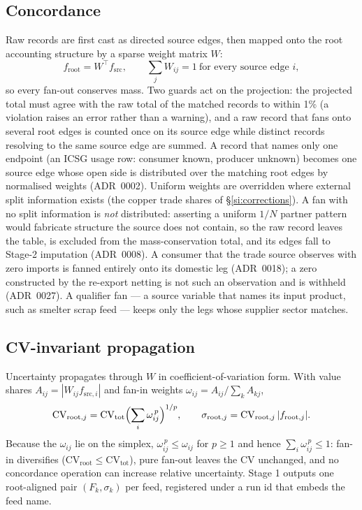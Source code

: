 \documentclass[11pt]{article}
\begin{document}
\subsection{Concordance}
Raw records are first cast as directed source edges, then mapped onto the
root accounting structure by a sparse weight matrix $W$:
\begin{equation}
f_{\mathrm{root}} = W^{\top} f_{\mathrm{src}},
\qquad \textstyle\sum_j W_{ij} = 1 \ \text{for every source edge } i,
\end{equation}
so every fan-out conserves mass. Two guards act on the projection: the
projected total must agree with the raw total of the matched records to
within 1\% (a violation raises an error rather than a warning), and a raw
record that fans onto several root edges is counted once on its source edge
while distinct records resolving to the same source edge are summed. A
record that names only one endpoint (an ICSG usage row: consumer known,
producer unknown) becomes one source edge whose open side is distributed
over the matching root edges by normalised weights (ADR~0002). Uniform
weights are overridden where external split information exists (the copper
trade shares of \S\ref{si:corrections}). A fan with no split information is
\emph{not} distributed: asserting a uniform $1/N$ partner pattern would
fabricate structure the source does not contain, so the raw record leaves
the table, is excluded from the mass-conservation total, and its edges fall
to Stage-2 imputation (ADR~0008). A consumer that the trade source observes
with zero imports is fanned entirely onto its domestic leg (ADR~0018); a
zero constructed by the re-export netting is not such an observation and is
withheld (ADR~0027). A qualifier fan --- a source variable that names its
input product, such as smelter scrap feed --- keeps only the legs whose
supplier sector matches.

\subsection{CV-invariant propagation}
Uncertainty propagates through $W$ in coefficient-of-variation form. With
value shares $A_{ij} = |W_{ij} f_{\mathrm{src},i}|$ and fan-in weights
$\omega_{ij} = A_{ij}/\sum_k A_{kj}$,
\begin{equation}
\mathrm{CV}_{\mathrm{root},j} = \mathrm{CV}_{\mathrm{tot}}
\Bigl(\sum_i \omega_{ij}^{\,p}\Bigr)^{1/p},
\qquad
\sigma_{\mathrm{root},j} = \mathrm{CV}_{\mathrm{root},j}\,
|f_{\mathrm{root},j}|.
\label{eq:si-cvprop}
\end{equation}
Because the $\omega_{ij}$ lie on the simplex, $\omega_{ij}^{\,p} \le
\omega_{ij}$ for $p \ge 1$ and hence $\sum_i \omega_{ij}^{\,p} \le 1$: fan-in
diversifies ($\mathrm{CV}_{\mathrm{root}} \le \mathrm{CV}_{\mathrm{tot}}$),
pure fan-out leaves the CV unchanged, and no concordance operation can
increase relative uncertainty. Stage 1 outputs one root-aligned pair
$(F_k, \sigma_k)$ per feed, registered under a run id that embeds the feed
name.
\end{document}
